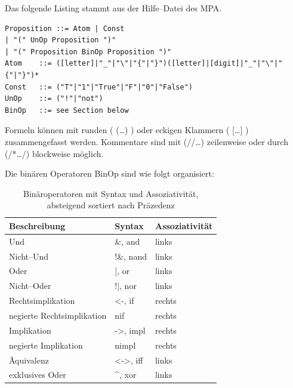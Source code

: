 \documentclass[ngerman,a4paper,abstracton,open=right,twoside=false,toc=listofnumbered,bibtotocnumbered]{scrreprt}
\begin{document}
Das folgende Listing stammt aus der Hilfe--Datei des MPA. \cite{mpa}

\begin{verbatim}	
Proposition	::=	Atom | Const
| "(" UnOp Proposition ")"
| "(" Proposition BinOp Proposition ")"
Atom	::=	([letter]|"_"|"\"|"{"|"}")([letter]|[digit]|"_"|"\"|"{"|"}")*
Const	::=	("T"|"1"|"True"|"F"|"0"|"False")
UnOp	::=	("!"|"not")
BinOp	::=	see Section below
\end{verbatim}

Formeln können mit runden ( (\dots) ) oder eckigen Klammern ( [\dots] ) zusammengefasst werden. Kommentare sind mit (//\dots) zeilenweise oder durch (/*\dots */) blockweise möglich.

Die binären Operatoren \glqq{}BinOp\grqq{} sind wie folgt organisiert:

\begin{table}[h]
	\begin{tabular}{|l|l|l|}
		\hline
		\textbf{Beschreibung} & \textbf{Syntax} & \textbf{Assoziativität} \\
		\hline
		Und & \&, and & links \\ \hline
		Nicht--Und & !\&, nand & links \\ \hline
		Oder & |, or & links \\ \hline
		Nicht--Oder & !|, nor & links \\ \hline
		Rechtsimplikation & <-, if & rechts \\ \hline
		negierte Rechtsimplikation & nif & rechts \\ \hline
		Implikation & ->, impl & rechts \\ \hline
		negierte Implikation & nimpl & rechts \\ \hline
		Äquivalenz & <->, iff & links \\ \hline
		exklusives Oder & \textasciicircum, xor & links \\ \hline
	\end{tabular}
	\caption{Binäroperatoren mit Syntax und Assoziativität, absteigend sortiert nach Präzedenz}
\end{table}
\end{document}
